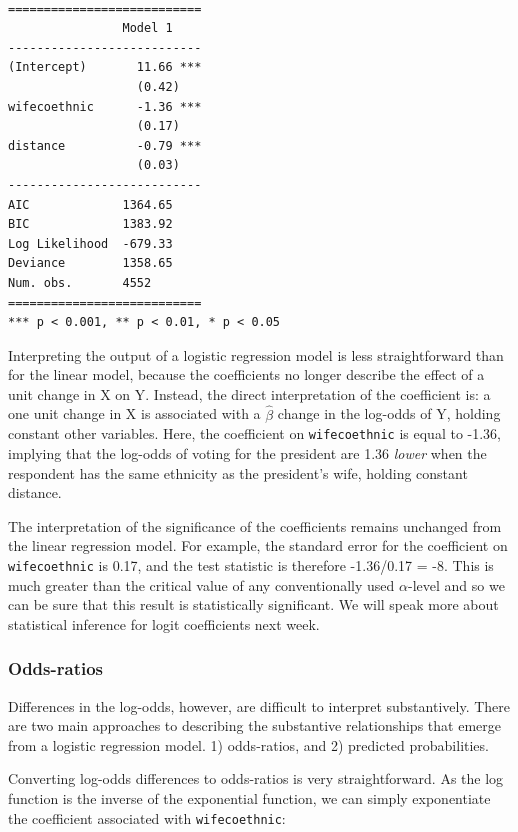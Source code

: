 \documentclass[]{article}
\theoremstyle{definition}
\theoremstyle{definition}
\theoremstyle{definition}
\theoremstyle{remark}
\begin{document}
\begin{verbatim}

===========================
                Model 1    
---------------------------
(Intercept)       11.66 ***
                  (0.42)   
wifecoethnic      -1.36 ***
                  (0.17)   
distance          -0.79 ***
                  (0.03)   
---------------------------
AIC             1364.65    
BIC             1383.92    
Log Likelihood  -679.33    
Deviance        1358.65    
Num. obs.       4552       
===========================
*** p < 0.001, ** p < 0.01, * p < 0.05
\end{verbatim}

Interpreting the output of a logistic regression model is less
straightforward than for the linear model, because the coefficients no
longer describe the effect of a unit change in X on Y. Instead, the
direct interpretation of the coefficient is: a one unit change in X is
associated with a \(\hat{\beta}\) change in the log-odds of Y, holding
constant other variables. Here, the coefficient on \texttt{wifecoethnic}
is equal to -1.36, implying that the log-odds of voting for the
president are 1.36 \emph{lower} when the respondent has the same
ethnicity as the president's wife, holding constant distance.

The interpretation of the significance of the coefficients remains
unchanged from the linear regression model. For example, the standard
error for the coefficient on \texttt{wifecoethnic} is 0.17, and the test
statistic is therefore -1.36/0.17 = -8. This is much greater than the
critical value of any conventionally used \(\alpha\)-level and so we can
be sure that this result is statistically significant. We will speak
more about statistical inference for logit coefficients next week.

\subsubsection{Odds-ratios}\label{odds-ratios}

Differences in the log-odds, however, are difficult to interpret
substantively. There are two main approaches to describing the
substantive relationships that emerge from a logistic regression model.
1) odds-ratios, and 2) predicted probabilities.

Converting log-odds differences to odds-ratios is very straightforward.
As the log function is the inverse of the exponential function, we can
simply exponentiate the coefficient associated with
\texttt{wifecoethnic}:
\end{document}
